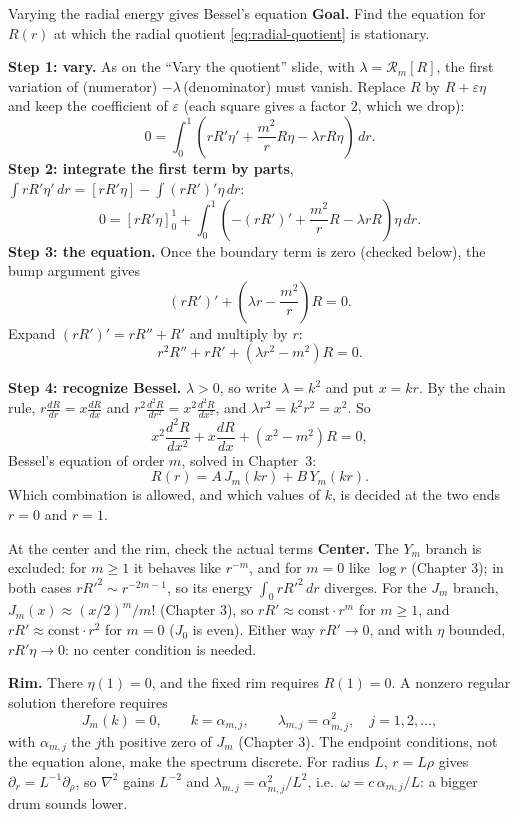 \documentclass[11pt]{beamer}
\newcommand{\dd}{\,d}
\newcommand{\R}{\mathcal R}
\begin{document}
\begin{frame}[allowframebreaks=1.00]{Varying the radial energy gives Bessel's equation}
\small
\textbf{Goal.} Find the equation for \(R(r)\) at which the radial quotient \eqref{eq:radial-quotient} is stationary.

\textbf{Step 1: vary.} As on the ``Vary the quotient'' slide, with \(\lambda=\R_m[R]\), the first variation of
(numerator) \(-\lambda\,\)(denominator) must vanish. Replace \(R\) by \(R+\varepsilon\eta\) and keep the coefficient of \(\varepsilon\)
(each square gives a factor \(2\), which we drop):
\[
 0=\int_0^1\left(rR'\eta'+\frac{m^2}{r}R\eta-\lambda rR\eta\right)\dd r .
\]
\textbf{Step 2: integrate the first term by parts}, \(\int rR'\eta'\,dr=[rR'\eta]-\int(rR')'\eta\,dr\):
\[
 0=[rR'\eta]_0^1+
  \int_0^1\left(-(rR')'+\frac{m^2}{r}R-\lambda rR\right)\eta\dd r .
\]
\textbf{Step 3: the equation.} Once the boundary term is zero (checked below), the bump argument gives
\[
 (rR')'+\left(\lambda r-\frac{m^2}{r}\right)R=0 .
\]
Expand \((rR')'=rR''+R'\) and multiply by \(r\):
\[
 r^2R''+rR'+(\lambda r^2-m^2)R=0 .
\]
\par\framebreak\par
\textbf{Step 4: recognize Bessel.} \(\lambda>0\), so write \(\lambda=k^2\) and put \(x=kr\). By the chain rule,
\(r\frac{dR}{dr}=x\frac{dR}{dx}\) and \(r^2\frac{d^2R}{dr^2}=x^2\frac{d^2R}{dx^2}\), and \(\lambda r^2=k^2r^2=x^2\). So
\[
 x^2\frac{d^2R}{dx^2}+x\frac{dR}{dx}+(x^2-m^2)R=0 ,
\]
Bessel's equation of order \(m\), solved in Chapter~3:
\[
 R(r)=A\,J_m(kr)+B\,Y_m(kr).
\]
Which combination is allowed, and which values of \(k\), is decided at the two ends \(r=0\) and \(r=1\).
\end{frame}

\begin{frame}{At the center and the rim, check the actual terms}
\small
\textbf{Center.} The $Y_m$ branch is excluded: for $m\ge1$ it behaves like $r^{-m}$, and
for $m=0$ like $\log r$ (Chapter 3); in both cases $rR'^2\sim r^{-2m-1}$, so its energy
$\int_0 rR'^2\dd r$ diverges. For the $J_m$ branch, $J_m(x)\approx(x/2)^m/m!$ (Chapter 3), so
$rR'\approx\text{const}\cdot r^m$ for $m\ge1$, and $rR'\approx\text{const}\cdot r^2$ for $m=0$ ($J_0$ is even).
Either way $rR'\to0$, and with $\eta$ bounded, $rR'\eta\to0$: no center condition is needed.

\medskip
\textbf{Rim.} There $\eta(1)=0$, and the fixed rim requires $R(1)=0$.
A nonzero regular solution therefore requires
\begin{equation}
 J_m(k)=0,\qquad k=\alpha_{m,j},\qquad
 \lambda_{m,j}=\alpha_{m,j}^2,\quad j=1,2,\ldots ,\label{eq:disk-spectrum}
\end{equation}
with $\alpha_{m,j}$ the $j$th positive zero of $J_m$ (Chapter 3). The endpoint conditions, not the
equation alone, make the spectrum discrete.
For radius $L$, $r=L\rho$ gives $\partial_r=L^{-1}\partial_\rho$, so $\nabla^2$ gains $L^{-2}$
and $\lambda_{m,j}=\alpha_{m,j}^2/L^2$, i.e.\ $\omega=c\,\alpha_{m,j}/L$: a bigger drum sounds lower.
\end{frame}
\end{document}

